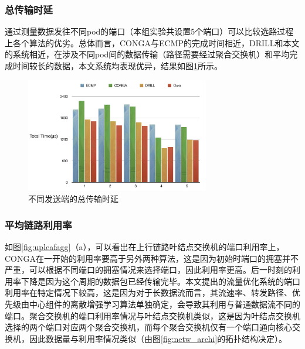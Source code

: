 \subsubsection{总传输时延}
通过测量数据发往不同pod的端口（本组实验共设置5个端口）可以比较选路过程上各个算法的优劣。总体而言，CONGA与ECMP的完成时间相近，DRILL和本文的系统相近，在涉及不同pod间的数据传输（路径需要经过聚合交换机）和平均完成时间较长的数据，本文系统均表现优异，结果如图\ref{fig:total_time}所示。
\begin{figure}[ht]
\centering
\includegraphics[height=5cm]{figure/total_time.png}
\caption{不同发送端的总传输时延}
\label{fig:total_time}
\end{figure}


\subsubsection{平均链路利用率}

如图\ref{fig:upleafagg}（a），可以看出在上行链路叶结点交换机的端口利用率上，CONGA在一开始的利用率要高于另外两种算法，这是因为初始时端口的拥塞并不严重，可以根据不同端口的拥塞情况来选择端口，因此利用率更高。后一时刻的利用率下降是因为这个周期的数据包已经传输完毕。本文提出的流量优化系统的端口利用率在特定情况下较高，这是因为对于长数据流而言，其流速率、转发路径、优先级由中心组件的离散增强学习算法单独确定，会导致其利用与普通数据流不同的端口。聚合交换机的端口利用率情况与叶结点交换机类似，这是因为叶结点交换机选择的两个端口对应两个聚合交换机，而每个聚合交换机仅有一个端口通向核心交换机，因此数据量与利用率情况类似（由图\ref{fig:netw_archi}的拓扑结构决定）。

